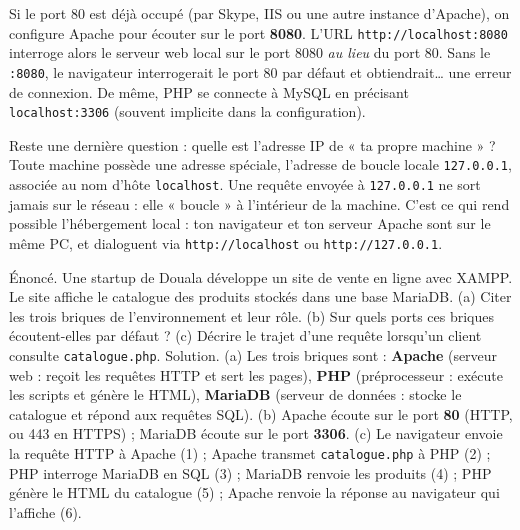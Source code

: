 \documentclass[11pt]{article}
\newcommand{\cle}[1]{{\popxbold\color{popdark}#1}}
\begin{document}
\begin{exemplebox}
Si le port 80 est déjà occupé (par Skype, IIS ou une autre instance d'Apache), on configure Apache pour écouter sur le port \textbf{8080}. L'URL \texttt{http://localhost:8080} interroge alors le serveur web local sur le port 8080 \emph{au lieu} du port 80. Sans le \texttt{:8080}, le navigateur interrogerait le port 80 par défaut et obtiendrait… une erreur de connexion. De même, PHP se connecte à MySQL en précisant \texttt{localhost:3306} (souvent implicite dans la configuration).
\end{exemplebox}

Reste une dernière question : quelle est l'adresse IP de « ta propre machine » ? Toute machine possède une adresse spéciale, l'\cle{adresse de boucle locale} \texttt{127.0.0.1}, associée au nom d'hôte \texttt{localhost}. Une requête envoyée à \texttt{127.0.0.1} ne sort jamais sur le réseau : elle « boucle » à l'intérieur de la machine. C'est ce qui rend possible l'hébergement local : ton navigateur et ton serveur Apache sont sur le même PC, et dialoguent via \texttt{http://localhost} ou \texttt{http://127.0.0.1}.

\begin{exoresolu}
Énoncé. Une startup de Douala développe un site de vente en ligne avec XAMPP. Le site affiche le catalogue des produits stockés dans une base MariaDB. (a) Citer les trois briques de l'environnement et leur rôle. (b) Sur quels ports ces briques écoutent-elles par défaut ? (c) Décrire le trajet d'une requête lorsqu'un client consulte \texttt{catalogue.php}.
\tcblower
Solution. (a) Les trois briques sont : \textbf{Apache} (serveur web : reçoit les requêtes HTTP et sert les pages), \textbf{PHP} (préprocesseur : exécute les scripts et génère le HTML), \textbf{MariaDB} (serveur de données : stocke le catalogue et répond aux requêtes SQL). (b) Apache écoute sur le port \textbf{80} (HTTP, ou 443 en HTTPS) ; MariaDB écoute sur le port \textbf{3306}. (c) Le navigateur envoie la requête HTTP à Apache (1) ; Apache transmet \texttt{catalogue.php} à PHP (2) ; PHP interroge MariaDB en SQL (3) ; MariaDB renvoie les produits (4) ; PHP génère le HTML du catalogue (5) ; Apache renvoie la réponse au navigateur qui l'affiche (6).
\end{exoresolu}
\end{document}
